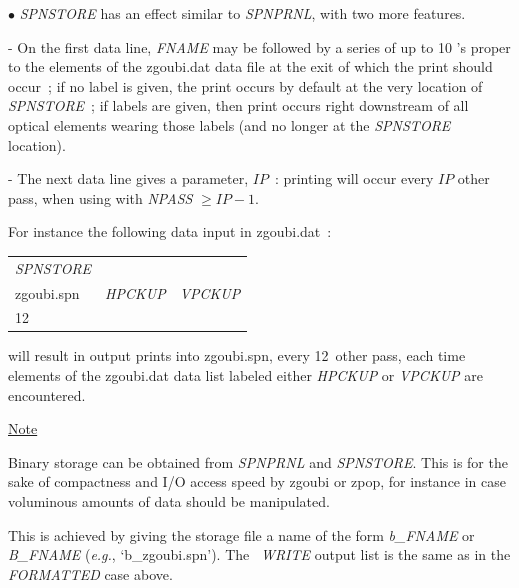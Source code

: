 \medskip

\noindent  $\bullet$   \textsl{SPNSTORE} has an effect similar to \textsl{SPNPRNL}, with two more features. 

- On the first data line, \textsl{FNAME} may be followed 
by a series of up to 10 \LABEL's proper to the elements of the zgoubi.dat data 
file at the exit of which the print should occur~; if no label is given, 
the print occurs by default at the very location of \textsl{SPNSTORE}~; 
if  labels are given, then print occurs right downstream of all optical elements wearing those labels
 (and no longer at the \textsl{SPNSTORE} location). 

- The next data line 
gives a parameter, $IP$~: printing will occur every $IP$ other pass, when 
using \REBELOTE{} with \textsl{NPASS} $ \geq IP-1$. 

For instance the following data input in zgoubi.dat~: 

\medskip

{\renewcommand{\arraystretch}{1}
\begin{tabular}{lll}
	\textsl{SPNSTORE} &  &   \\
	zgoubi.spn \index{zgoubi.fai} & \textsl{HPCKUP} & \textsl{VPCKUP}  \\
	12 &  & 
\end{tabular}}

\medskip

\noindent will result in output prints into zgoubi.spn, every 12~other 
pass, each time elements of the zgoubi.dat  data list labeled either \textsl{HPCKUP}
or \textsl{VPCKUP} are encountered.

\medskip

\noindent\underline{Note}

\medskip

\noindent Binary storage can be obtained from \textsl{SPNPRNL} and \textsl{SPNSTORE}. This is for 
the sake of compactness and I/O access speed by zgoubi  or zpop, for instance  in case  voluminous amounts of 
data should be manipulated. 

\noindent This is achieved by giving the storage file a name of the form \textsl{b\_FNAME} 
or \textsl{B\_FNAME}  (\emph{e.g.}, `b\_zgoubi.spn'). The \FORTRAN\ \textsl{WRITE} output list 
is the same as in the \textsl{FORMATTED} case above.  







